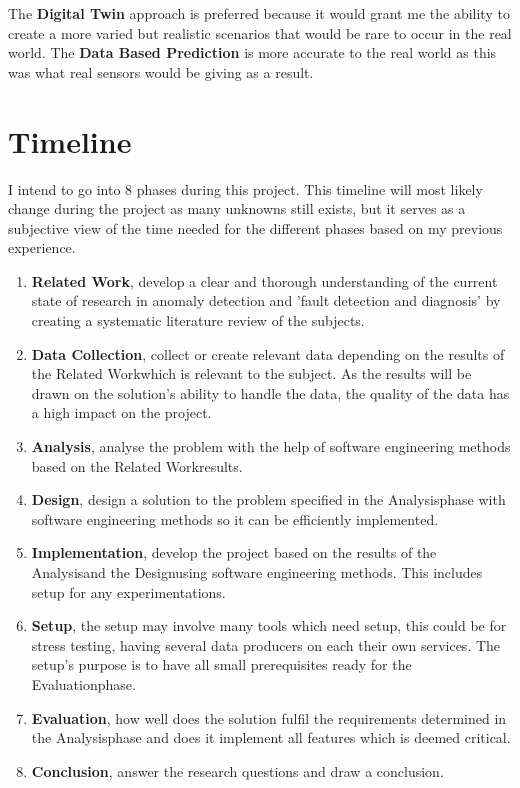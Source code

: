 \documentclass[a4paper,8pt]{article}
\newcommand{\Phases}{8 }
\newcommand{\phaseq}{Related Work}
\newcommand{\phasew}{Data Collection}
\newcommand{\phasee}{Analysis}
\newcommand{\phaser}{Design}
\newcommand{\phaset}{Implementation}
\newcommand{\phaseSetup}{Setup}
\newcommand{\phasey}{Evaluation}
\newcommand{\phaseu}{Conclusion}
\begin{document}
		The \textbf{Digital Twin} approach is preferred because it would grant me the ability to create a more varied but realistic scenarios that would be rare to occur in the real world. The \textbf{Data Based Prediction} is more accurate to the real world as this was what real sensors would be giving as a result.
	\section{Timeline}
	I intend to go into \Phases phases during this project. This timeline will most likely change during the project as many unknowns still exists, but it serves as a subjective view of the time needed for the different phases based on my previous experience.
		\begin{enumerate}
			\item \textbf{\phaseq}, develop a clear and thorough understanding of the current state of research in anomaly detection and 'fault detection and diagnosis' by creating a systematic literature review of the subjects.
			\item \textbf{\phasew}, collect or create relevant data depending on the results of the \phaseq \space which is relevant to the subject. As the results will be drawn on the solution's ability to handle the data, the quality of the data has a high impact on the project.
			\item \textbf{\phasee}, analyse the problem with the help of software engineering methods based on the \phaseq \space results.
			\item \textbf{\phaser}, design a solution to the problem specified in the \phasee \space phase with software engineering methods so it can be efficiently implemented.
			\item \textbf{\phaset}, develop the project based on the results of the \phasee \space and the \phaser \space using software engineering methods. This includes setup for any experimentations.
			\item \textbf{\phaseSetup}, the setup may involve many tools which need setup, this could be for stress testing, having several data producers on each their own services. The setup's purpose is to have all small prerequisites ready for the \phasey \space phase.
			\item \textbf{\phasey}, how well does the solution fulfil the requirements determined in the \phasee \space phase and does it implement all features which is deemed critical.
			\item \textbf{\phaseu}, answer the research questions and draw a conclusion.
		\end{enumerate}
	
\end{document}
